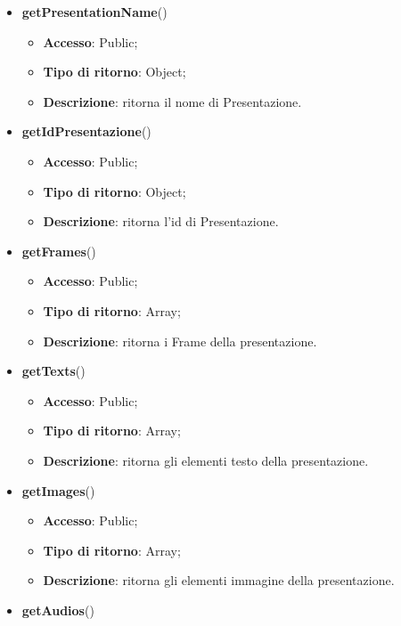 {\begin{itemize}
\begin{itemize}
				\item \textbf{Descrizione}: ritorna Presentazione.
			\end{itemize}
			\item \textbf{getPresentationName}()
			\begin{itemize}
				\item \textbf{Accesso}: Public;
				\item \textbf{Tipo di ritorno}: Object;
				\item \textbf{Descrizione}: ritorna il nome di Presentazione.
			\end{itemize}
			\item \textbf{getIdPresentazione}()
			\begin{itemize}
				\item \textbf{Accesso}: Public;
				\item \textbf{Tipo di ritorno}: Object;
				\item \textbf{Descrizione}: ritorna l'id di Presentazione.
			\end{itemize}
			\item \textbf{getFrames}()
			\begin{itemize}
				\item \textbf{Accesso}: Public;
				\item \textbf{Tipo di ritorno}: Array;
				\item \textbf{Descrizione}: ritorna i Frame della presentazione.
			\end{itemize}
			\item \textbf{getTexts}()
			\begin{itemize}
				\item \textbf{Accesso}: Public;
				\item \textbf{Tipo di ritorno}: Array;
				\item \textbf{Descrizione}: ritorna gli elementi testo della presentazione.
			\end{itemize}
			\item \textbf{getImages}()
			\begin{itemize}
				\item \textbf{Accesso}: Public;
				\item \textbf{Tipo di ritorno}: Array;
				\item \textbf{Descrizione}: ritorna gli elementi immagine della presentazione.
			\end{itemize}
			\item \textbf{getAudios}()
			\begin{itemize}

\end{itemize}
\end{itemize}}

